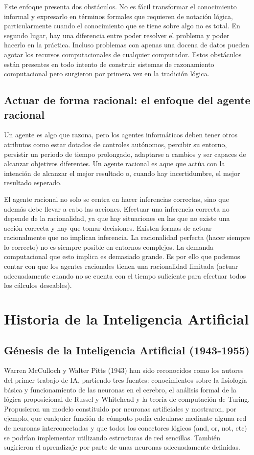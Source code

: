 \documentclass[12pt,a4paper]{article}
\begin{document}
Este enfoque presenta dos obstáculos. No es fácil transformar el conocimiento informal y expresarlo en términos formales que requieren de notación lógica, particularmente cuando el conocimiento que se tiene sobre algo no es total. En segundo lugar, hay una diferencia entre poder resolver el problema y poder hacerlo en la práctica. Incluso problemas con apenas una docena de datos pueden agotar los recursos computacionales de cualquier computador. Estos obstáculos están presentes en todo intento de construir sistemas de razonamiento computacional pero surgieron por primera vez en la tradición lógica.

\subsection{Actuar de forma racional: el enfoque del agente racional}
Un agente es algo que razona, pero los agentes informáticos deben tener otros atributos como estar dotados de controles autónomos, percibir su entorno, persistir un periodo de tiempo prolongado, adaptarse a cambios y ser capaces de alcanzar objetivos diferentes. Un agente racional es aque que actúa con la intención de alcanzar el mejor resultado o, cuando hay incertidumbre, el mejor resultado esperado.

El agente racional no solo se centra en hacer inferencias correctas, sino que además debe llevar a cabo las acciones. Efectuar una inferencia correcta no depende de la racionalidad, ya que hay situaciones en las que no existe una acción correcta y hay que tomar decisiones. Existen formas de actuar racionalmente que no implican inferencia. La racionalidad perfecta (hacer siempre lo correcto) no es siempre posible en entornos complejos. La demanda computacional que esto implica es demasiado grande. Es por ello que podemos contar con que los agentes racionales tienen una racionalidad limitada (actuar adecuadamente cuando no se cuenta con el tiempo suficiente para efectuar todos los cálculos deseables).

\section{Historia de la Inteligencia Artificial}
\subsection{Génesis de la Inteligencia Artificial (1943-1955)}
Warren McCulloch y Walter Pitts (1943) han sido reconocidos como los autores del primer trabajo de IA, partiendo tres fuentes: conocimientos sobre la fisiología básica y funcionamiento de las neuronas en el cerebro, el análisis formal de la lógica proposicional de Russel y Whitehead y la teoría de computación de Turing. Propusieron un modelo constituido por neuronas artificiales y mostraron, por ejemplo, que cualquier función de cómputo podía calcularse mediante alguna red de neuronas interconectadas y que todos los conectores lógicos (and, or, not, etc) se podrían implementar utilizando estructuras de red sencillas. También sugirieron el aprendizaje por parte de unas neuronas adecuadamente definidas.
\end{document}
